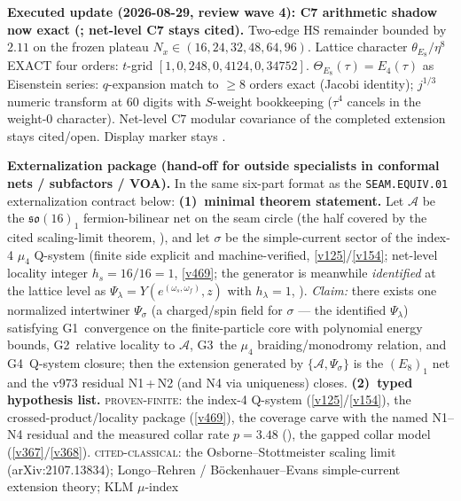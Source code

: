 \documentclass[11pt,a4paper]{article}
\begin{document}
\par\smallskip\noindent\textbf{Executed update (2026-08-29, review wave 4): C7 arithmetic shadow
now exact
(; net-level C7 stays
cited).}
Two-edge HS remainder bounded by $2.11$ on the frozen plateau $N_x\in(16,24,32,48,64,96)$.
Lattice character $\theta_{E_8}/\eta^8$ EXACT four orders: $t$-grid
$[1,0,248,0,4124,0,34752]$.  $\Theta_{E_8}(\tau)=E_4(\tau)$ as Eisenstein series: $q$-expansion
match to $\ge8$ orders exact (Jacobi identity); $j^{1/3}$ numeric transform at $60$ digits with
$S$-weight bookkeeping ($\tau^4$ cancels in the weight-$0$ character).  Net-level C7 modular
covariance of the completed extension stays cited/open.  Display marker stays \mO.

\par\smallskip\noindent\textbf{Externalization package (hand-off for outside specialists in
conformal nets / subfactors / VOA).}  In the same six-part format as the \texttt{SEAM.EQUIV.01}
externalization contract below:
\textbf{(1)~minimal theorem statement.}  Let $\mathcal A$ be the $\mathfrak{so}(16)_1$
fermion-bilinear net on the seam circle (the half covered by the cited scaling-limit theorem,
), and let $\sigma$ be the simple-current sector of the
index-4 $\mu_4$ Q-system (finite side explicit and machine-verified, \vref{v125}/\vref{v154};
net-level locality integer $h_s = 16/16 = 1$, \vref{v469}; the generator is meanwhile
\emph{identified} at the lattice level as $\Psi_\lambda = Y(e^{(\omega_s,\omega_f)},z)$ with
$h_\lambda = 1$, ).  \emph{Claim:} there exists one
normalized intertwiner $\Psi_\sigma$ (a charged/spin field for $\sigma$ --- the identified
$\Psi_\lambda$) satisfying
G1~convergence on the finite-particle core with polynomial energy bounds, G2~relative locality
to $\mathcal A$, G3~the $\mu_4$ braiding/monodromy relation, and G4~Q-system closure; then the
extension generated by $\{\mathcal A, \Psi_\sigma\}$ is the $(E_8)_1$ net and the v973
residual N1\,+\,N2 (and N4 via uniqueness) closes.
\textbf{(2)~typed hypothesis list.}  \textsc{proven-finite}: the index-4 Q-system
(\vref{v125}/\vref{v154}), the crossed-product/locality package (\vref{v469}), the coverage
carve with the named N1--N4 residual and the measured collar rate $p = 3.48$
(), the gapped collar model (\vref{v367}/\vref{v368}).
\textsc{cited-classical}: the Osborne--Stottmeister scaling limit (arXiv:2107.13834);
Longo--Rehren / B\"ockenhauer--Evans simple-current extension theory; KLM $\mu$-index
\end{document}
